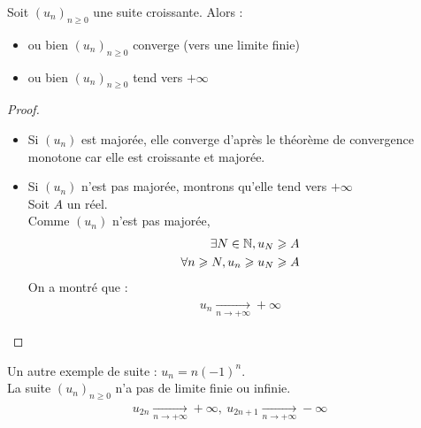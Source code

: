 \begin{graybox}
\begin{theoreme}
    Soit $(u_n)_{n \geq 0}$ une suite croissante. Alors :
    \begin{itemize}
        \item ou bien $(u_n)_{n \geq 0}$ converge (vers une limite finie)
        \item ou bien $(u_n)_{n \geq 0}$ tend vers $+\infty$
    \end{itemize}
\end{theoreme}
\end{graybox}
\begin{proof}~ 
    \begin{itemize}
        \item Si $(u_n)$ est majorée, elle converge d'après le théorème de convergence monotone car elle est croissante et majorée.
        \item Si $(u_n)$ n'est pas majorée, montrons qu'elle tend vers $+\infty$ \\
        Soit $A$ un réel. \\
        Comme $(u_n)$ n'est pas majorée, 
        \begin{align*}
            \exists N \in \mathbb{N}, u_N \geqslant A \\
            \forall n \geqslant N, u_n \geqslant u_N \geqslant A
        \end{align*}
        On a montré que :
        \begin{align*}
            u_n \xrightarrow[n \to +\infty]{} +\infty
        \end{align*}
    \end{itemize}
\end{proof}

\begin{exemple}
    Un autre exemple de suite : $u_n = n(-1)^n$. \\
    La suite $(u_n)_{n \geq 0}$ n'a pas de limite finie ou infinie.
    \begin{align*}
        u_{2n} \xrightarrow[n \to +\infty]{} +\infty,\ u_{2n+1} \xrightarrow[n \to +\infty]{} -\infty
    \end{align*}
\end{exemple}

